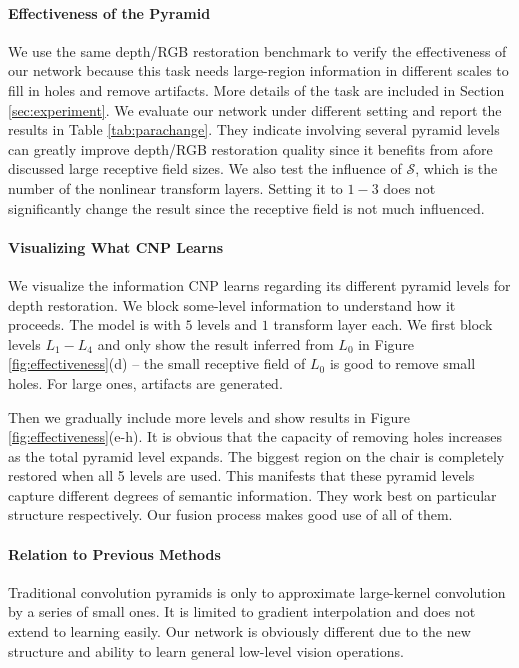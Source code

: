 \documentclass[10pt,twocolumn,letterpaper]{article}
\begin{document}
\vspace{-0.1in}\paragraph{Effectiveness of the Pyramid} We use the same depth/RGB
restoration benchmark to verify the effectiveness of our network because this task needs
large-region information in different scales to fill in holes and remove artifacts. More
details of the task are included in Section \ref{sec:experiment}. We evaluate our network
under different setting and report the results in Table \ref{tab:parachange}. They
indicate involving several pyramid levels can greatly improve depth/RGB restoration
quality since it benefits from afore discussed large receptive field sizes. We also test
the influence of $\mathcal{S}$, which is the number of the nonlinear transform layers.
Setting it to $1-3$ does not significantly change the result since the receptive field is
not much influenced.

\vspace{-0.15in}\paragraph{Visualizing What CNP Learns} We visualize the information CNP
learns regarding its different pyramid levels for depth restoration. We block some-level
information to understand how it proceeds. The model is with $5$ levels and $1$ transform
layer each. We first block levels $L_1-L_4$ and only show the result inferred from $L_0$
in Figure \ref{fig:effectiveness}(d) -- the small receptive field of $L_0$ is good to
remove small holes. For large ones, artifacts are generated.

Then we gradually include more levels and show results in Figure
\ref{fig:effectiveness}(e-h). It is obvious that the capacity of removing holes increases
as the total pyramid level expands. The biggest region on the chair is completely
restored when all 5 levels are used. This manifests that these pyramid levels capture
different degrees of semantic information. They work best on particular structure
respectively. Our fusion process makes good use of all of them.


\vspace{-0.15in}\paragraph{Relation to Previous Methods~~} Traditional convolution
pyramids \cite{FarbmanFL11} is only to approximate large-kernel convolution by a series
of small ones. It is limited to gradient interpolation and does not extend to learning
easily. Our network is obviously different due to the new structure and ability to learn
general low-level vision operations.
\end{document}
